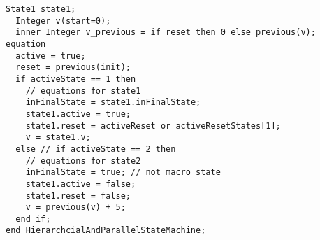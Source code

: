 \begin{example}
\begin{lstlisting}[language=modelica]
  State1 state1;
  Integer v(start=0);
  inner Integer v_previous = if reset then 0 else previous(v);
equation
  active = true;
  reset = previous(init);
  if activeState == 1 then
    // equations for state1
    inFinalState = state1.inFinalState;
    state1.active = true;
    state1.reset = activeReset or activeResetStates[1];
    v = state1.v;
  else // if activeState == 2 then
    // equations for state2
    inFinalState = true; // not macro state
    state1.active = false;
    state1.reset = false;
    v = previous(v) + 5;
  end if;
end HierarchcialAndParallelStateMachine;
\end{lstlisting}
\end{example}
